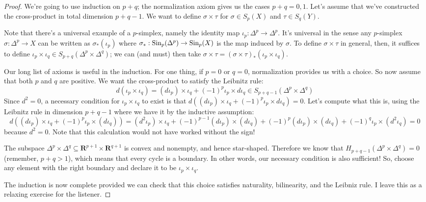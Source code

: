 \begin{proof} We're going to use induction on $p+q$; the normalization axiom 
gives us the cases $p+q=0,1$. Let's assume that we've constructed the cross-product in total dimension $p+q-1$. We want to define $\sigma\times\tau$ for 
$\sigma\in S_p(X)$ and $\tau\in S_q(Y)$. 

Note that there's a universal example of a $p$-simplex, namely the identity map $\iota_p:\Delta^p\to \Delta^p$. It's universal in the sense any $p$-simplex $\sigma:\Delta^p\to X$ can be written as $\sigma_\ast(\iota_p)$ where $\sigma_\ast:\mathrm{Sin}_p(\Delta^p)\to \mathrm{Sin}_p(X)$ is the map induced by $\sigma$. To define $\sigma\times\tau$ in general, then, it suffices to define $\iota_p\times\iota_q\in S_{p+q}(\Delta^p\times\Delta^q)$; we can (and must) then take
$\sigma\times\tau=(\sigma\times\tau)_*(\iota_p\times\iota_q)$. 

Our long list of axioms is useful in the induction. For one thing, if $p=0$ or
$q=0$, normalization provides us with a choice. So now assume that both $p$ and $q$ are positive. We want the cross-product
to satisfy the Leibnitz rule: 
		\begin{equation*}
d(\iota_p\times\iota_q) = (d\iota_p)\times\iota_q + (-1)^p\iota_p\times d\iota_q\in		S_{p+q-1}(\Delta^p\times\Delta^q)
		\end{equation*}
Since $d^2=0$, a necessary condition for $\iota_p\times\iota_q$ to exist is that $d((d\iota_p)\times\iota_q + (-1)^p\iota_p\times d\iota_q) =0$. Let's compute what this is, using the Leibnitz rule in dimension
$p+q-1$ where we have it by the inductive assumption:
		\begin{equation*}
		d((d\iota_p)\times\iota_q + (-1)^p\iota_p\times(d\iota_q)) = (d^2\iota_p)\times\iota_q + (-1)^{p-1}(d\iota_p)\times(d\iota_q) + (-1)^p(d\iota_p)\times(d\iota_q) + (-1)^q\iota_p\times(d^2\iota_q) = 0
		\end{equation*}
because $d^2=0$. Note that this calculation would not have worked without the sign! 

The subspace $\Delta^p\times\Delta^q\subseteq\mathbf{R}^{p+1}\times\mathbf{R}^{q+1}$ is convex and nonempty, and hence star-shaped. Therefore we know that $ H_{p+q-1}(\Delta^p\times\Delta^q)=0$ (remember, $p+q>1$), which means that every cycle is a boundary. In other words, our necessary condition is also sufficient! So, choose any element 
with the right boundary and declare it to be $\iota_p\times\iota_q$.

The induction is now complete provided we can check that this choice satisfies naturality, bilinearity, and the Leibniz rule. I leave this as a relaxing exercise for the listener. 
\end{proof}

